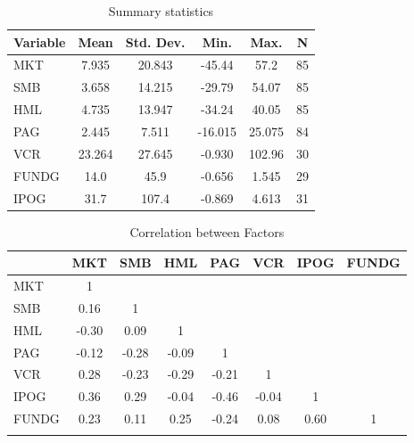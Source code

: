 \documentclass[12pt]{article}
\begin{document}
\begin{table}[htbp]\centering \caption{Summary statistics \label{sumstat}}
\begin{tabular}{l c c c c c}\hline\hline
\multicolumn{1}{c}{\textbf{Variable}} & \textbf{Mean}
 & \textbf{Std. Dev.}& \textbf{Min.} &  \textbf{Max.} & \textbf{N}\\ \hline
MKT & 7.935 & 20.843 & -45.44 & 57.2 & 85\\
SMB & 3.658 & 14.215 & -29.79 & 54.07 & 85\\
HML & 4.735 & 13.947 & -34.24 & 40.05 & 85\\
PAG & 2.445 & 7.511 & -16.015 & 25.075 & 84\\
VCR & 23.264 & 27.645 & -0.930 & 102.96 & 30\\
FUNDG & 14.0 & 45.9 & -0.656 & 1.545 & 29\\
IPOG & 31.7 & 107.4 & -0.869 & 4.613 & 31\\
\hline
\end{tabular}
\end{table}



\begin{table}[htbp]\centering
\def\sym#1{\ifmmode^{#1}\else\(^{#1}\)\fi}
\caption{Correlation between Factors}
\begin{tabular}{l*{7}{c}}
\addlinespace
\toprule
          &\multicolumn{1}{c}{MKT}&\multicolumn{1}{c}{SMB}&\multicolumn{1}{c}{HML}&\multicolumn{1}{c}{PAG}&\multicolumn{1}{c}{VCR}&\multicolumn{1}{c}{IPOG}&\multicolumn{1}{c}{FUNDG}\\

\midrule
MKT 	& 1    		&  			&      	&     		& 			&		&      	\\
SMB 	& 0.16    	& 1  		&      	&   	  	& 			&		&      	\\
HML 	& -0.30    	& 0.09  	& 1    	&   	  	& 			&		&      	\\
PAG 	& -0.12    	& -0.28  	& -0.09 &   1	  	& 			&  		&      	\\
VCR 	& 0.28    	& -0.23  	& -0.29	&   -0.21  	& 1			&		&      	\\
IPOG 	& 0.36    	& 0.29  	& -0.04	&   -0.46  	& -0.04		& 1		&      	\\
FUNDG 	& 0.23  	& 0.11  	& 0.25	&   -0.24  	& 0.08		& 0.60 	& 1    	\\

\addlinespace
\bottomrule
\end{tabular}
\end{table}
\end{document}
